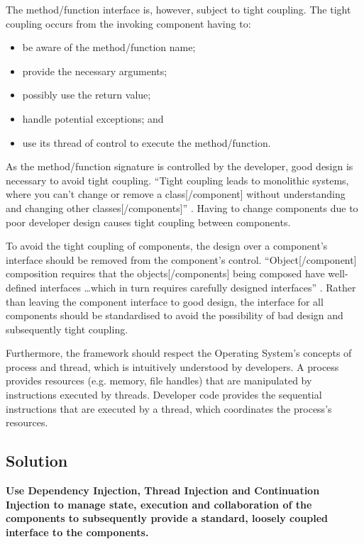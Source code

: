 \documentclass[prodmode]{style/acmlarge}
\begin{document}
The method/function interface is, however, subject to tight coupling.  The tight
coupling occurs from the invoking component having to:
\begin{itemize}
  \item be aware of the method/function name;
  \item provide the necessary arguments;
  \item possibly use the return value;
  \item handle potential exceptions; and
  \item use its thread of control to execute the method/function.
\end{itemize}

As the method/function signature is controlled by the developer, good design is
necessary to avoid tight coupling.  ``Tight coupling leads to monolithic
systems, where you can't change or remove a class[/component] without
understanding and changing other classes[/components]'' \cite[p. 24-25]{gof}.
Having to change components due to poor developer design causes tight coupling
between components.

To avoid the tight coupling of components, the design over a component's
interface should be removed from the component's control. ``Object[/component]
composition requires that the objects[/components] being composed have
well-defined interfaces \ldots which in turn requires carefully designed
interfaces'' \cite[p. 19]{gof}.  Rather than leaving the component interface to
good design, the interface for all components should be standardised to avoid
the possibility of bad design and subsequently tight coupling.

Furthermore, the framework should respect the Operating System's concepts of
process and thread, which is intuitively understood by developers.  A process
provides resources (e.g. memory, file handles) that are manipulated by
instructions executed by threads.  Developer code provides the sequential
instructions that are executed by a thread, which coordinates the process's
resources.


\subsection{Solution}

\textbf{Use Dependency Injection, Thread Injection and Continuation Injection to manage state, execution and collaboration of the components to subsequently provide a standard, loosely coupled interface to the components.}
\end{document}

